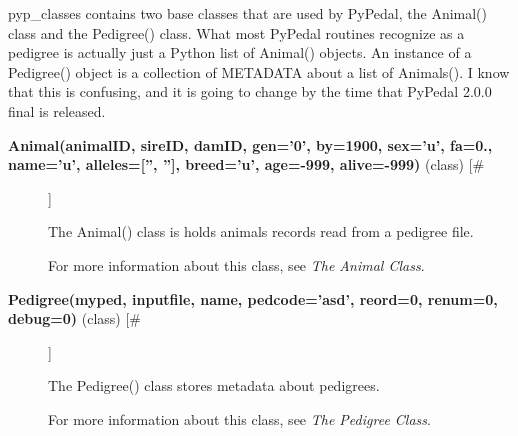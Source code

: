 \par pyp\_classes contains two base classes that are used by PyPedal, the Animal() class
and the Pedigree() class.  What most PyPedal routines recognize as a pedigree is
actually just a Python list of Animal() objects.  An instance of a Pedigree() object
is a collection of METADATA about a list of Animals().  I know that this is confusing,
and it is going to change by the time that PyPedal 2.0.0 final is released.
\begin{description}
\item[\textbf{Animal(animalID, sireID, damID, gen='0', by=1900, sex='u', fa=0., name='u', alleles=['', ''], breed='u', age=-999, alive=-999)} (class) [\#]
]
\par The Animal() class is holds animals records read from a pedigree file.
\par For more information about this class, see \textit{The Animal Class}.

\item[\textbf{Pedigree(myped, inputfile, name, pedcode='asd', reord=0, renum=0, debug=0)} (class) [\#]
]
\par The Pedigree() class stores metadata about pedigrees.
\par For more information about this class, see \textit{The Pedigree Class}.

\end{description}
